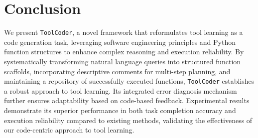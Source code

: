 \section{Conclusion}


We present \texttt{ToolCoder}, a novel framework that reformulates tool learning as a code generation task, leveraging software engineering principles and Python function structures to enhance complex reasoning and execution reliability. By systematically transforming natural language queries into structured function scaffolds, incorporating descriptive comments for multi-step planning, and maintaining a repository of successfully executed functions, \texttt{ToolCoder} establishes a robust approach to tool learning. Its integrated error diagnosis mechanism further ensures adaptability based on code-based feedback. Experimental results demonstrate its superior performance in both task completion accuracy and execution reliability compared to existing methods, validating the effectiveness of our code-centric approach to tool learning.
